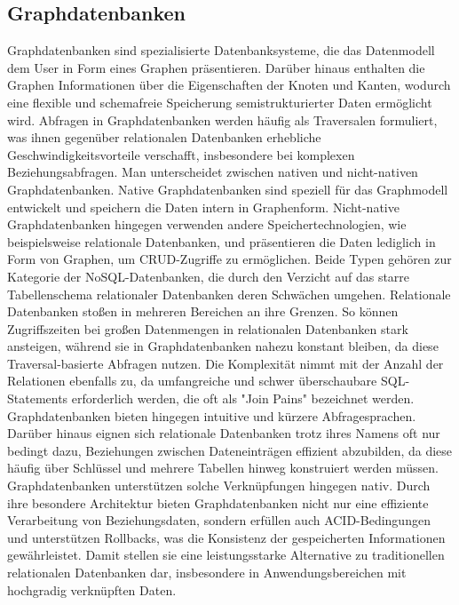 \subsection{Graphdatenbanken} %
\label{sec:graphDatenbanken}
Graphdatenbanken sind spezialisierte Datenbanksysteme, die das Datenmodell dem User in Form eines Graphen präsentieren. Darüber hinaus enthalten die Graphen Informationen über die Eigenschaften der Knoten und Kanten, wodurch eine flexible und schemafreie Speicherung semistrukturierter Daten ermöglicht wird. Abfragen in Graphdatenbanken werden häufig als Traversalen formuliert, was ihnen gegenüber relationalen Datenbanken erhebliche Geschwindigkeitsvorteile verschafft, insbesondere bei komplexen Beziehungsabfragen.
Man unterscheidet zwischen nativen und nicht-nativen Graphdatenbanken. Native Graphdatenbanken sind speziell für das Graphmodell entwickelt und speichern die Daten intern in Graphenform. Nicht-native Graphdatenbanken hingegen verwenden andere Speichertechnologien, wie beispielsweise relationale Datenbanken, und präsentieren die Daten lediglich in Form von Graphen, um CRUD-Zugriffe zu ermöglichen. Beide Typen gehören zur Kategorie der NoSQL-Datenbanken, die durch den Verzicht auf das starre Tabellenschema relationaler Datenbanken deren Schwächen umgehen.
Relationale Datenbanken stoßen in mehreren Bereichen an ihre Grenzen. So können Zugriffszeiten bei großen Datenmengen in relationalen Datenbanken stark ansteigen, während sie in Graphdatenbanken nahezu konstant bleiben, da diese Traversal-basierte Abfragen nutzen. Die Komplexität nimmt mit der Anzahl der Relationen ebenfalls zu, da umfangreiche und schwer überschaubare SQL-Statements erforderlich werden, die oft als "Join Pains" bezeichnet werden. Graphdatenbanken bieten hingegen intuitive und kürzere Abfragesprachen. Darüber hinaus eignen sich relationale Datenbanken trotz ihres Namens oft nur bedingt dazu, Beziehungen zwischen Dateneinträgen effizient abzubilden, da diese häufig über Schlüssel und mehrere Tabellen hinweg konstruiert werden müssen. Graphdatenbanken unterstützen solche Verknüpfungen hingegen nativ.
Durch ihre besondere Architektur bieten Graphdatenbanken nicht nur eine effiziente Verarbeitung von Beziehungsdaten, sondern erfüllen auch ACID-Bedingungen und unterstützen Rollbacks, was die Konsistenz der gespeicherten Informationen gewährleistet. Damit stellen sie eine leistungsstarke Alternative zu traditionellen relationalen Datenbanken dar, insbesondere in Anwendungsbereichen mit hochgradig verknüpften Daten.
\citep{9677042} \citep{graphdb} 

